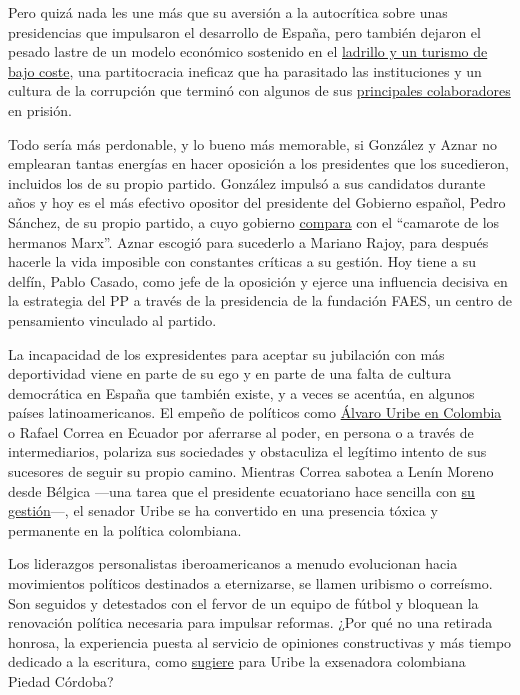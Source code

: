 Pero quizá nada les une más que su aversión a la autocrítica sobre unas
presidencias que impulsaron el desarrollo de España, pero también
dejaron el pesado lastre de un modelo económico sostenido en el
\href{https://www.nytimes.com/es/2019/08/05/espanol/opinion/turismo-espana.html}{ladrillo
y un turismo de bajo coste}, una partitocracia ineficaz que ha
parasitado las instituciones y un cultura de la corrupción que terminó
con algunos de sus
\href{https://www.eldiario.es/politica/sumarios-ministros-aznar-llegaron-corrupcion_1_2108010.html}{principales
colaboradores} en prisión.

Todo sería más perdonable, y lo bueno más memorable, si González y Aznar
no emplearan tantas energías en hacer oposición a los presidentes que
los sucedieron, incluidos los de su propio partido. González impulsó a
sus candidatos durante años y hoy es el más efectivo opositor del
presidente del Gobierno español, Pedro Sánchez, de su propio partido, a
cuyo gobierno
\href{https://www.elindependiente.com/politica/2020/06/11/felipe-gonzalez-compara-el-gobierno-con-el-camarote-de-los-hermanos-marx/}{compara}
con el ``camarote de los hermanos Marx''. Aznar escogió para sucederlo a
Mariano Rajoy, para después hacerle la vida imposible con constantes
críticas a su gestión. Hoy tiene a su delfín, Pablo Casado, como jefe de
la oposición y ejerce una influencia decisiva en la estrategia del PP a
través de la presidencia de la fundación FAES, un centro de pensamiento
vinculado al partido.

La incapacidad de los expresidentes para aceptar su jubilación con más
deportividad viene en parte de su ego y en parte de una falta de cultura
democrática en España que también existe, y a veces se acentúa, en
algunos países latinoamericanos. El empeño de políticos como
\href{https://www.nytimes.com/es/2018/06/07/espanol/opinion/opinion-colombo-alvaro-uribe-colombia-duque.html}{Álvaro
Uribe en Colombia} o Rafael Correa en Ecuador por aferrarse al poder, en
persona o a través de intermediarios, polariza sus sociedades y
obstaculiza el legítimo intento de sus sucesores de seguir su propio
camino. Mientras Correa sabotea a Lenín Moreno desde Bélgica ---una
tarea que el presidente ecuatoriano hace sencilla con
\href{https://www.nytimes.com/es/2020/07/08/espanol/opinion/ecuador-lenin-moreno.html}{su
gestión}---, el senador Uribe se ha convertido en una presencia tóxica y
permanente en la política colombiana.

Los liderazgos personalistas iberoamericanos a menudo evolucionan hacia
movimientos políticos destinados a eternizarse, se llamen uribismo o
correísmo. Son seguidos y detestados con el fervor de un equipo de
fútbol y bloquean la renovación política necesaria para impulsar
reformas. ¿Por qué no una retirada honrosa, la experiencia puesta al
servicio de opiniones constructivas y más tiempo dedicado a la
escritura, como
\href{https://www.semana.com/semana-tv/vicky-en-semana/articulo/piedad-cordoba-explico-por-que-uribe-y-petro-se-deben-retirar--colombia-hoy/687160}{sugiere}
para Uribe la exsenadora colombiana Piedad Córdoba?

